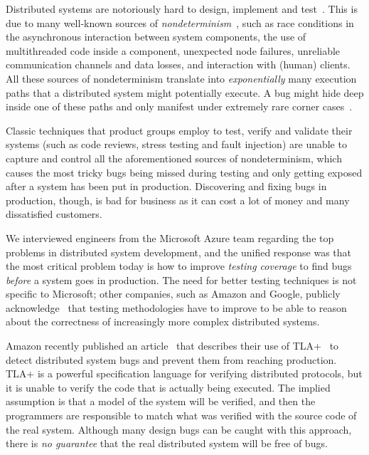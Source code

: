 Distributed systems are notoriously hard to design, implement and test~\cite{cavage2013there, maddox2015test}. This is due to many well-known sources of \emph{nondeterminism}~\cite{chandra2007paxos}, such as race conditions in the asynchronous interaction between system components, the use of multithreaded code inside a component, unexpected node failures, unreliable communication channels and data losses, and interaction with (human) clients.
%
All these sources of nondeterminism translate into \emph{exponentially} many execution paths that a distributed system might potentially execute. A bug might hide deep inside one of these paths and only manifest under extremely rare corner cases~\cite{gray1986computers, musuvathi2008finding}.

Classic techniques that product groups employ to test, verify and validate their systems (such as code reviews, stress testing and fault injection) are unable to capture and control all the aforementioned sources of nondeterminism, which causes the most tricky bugs being missed during testing and only getting exposed after a system has been put in production. Discovering and fixing bugs in production, though, is bad for business as it can cost a lot of money and many dissatisfied customers.

We interviewed engineers from the Microsoft Azure team regarding the top problems in distributed system development, and the unified response was that the most critical problem today is how to improve \emph{testing coverage} to find bugs \emph{before} a system goes in production. The need for better testing techniques is not specific to Microsoft; other companies, such as Amazon and Google, publicly acknowledge~\cite{newcombe2015aws} that testing methodologies have to improve to be able to reason about the correctness of increasingly more complex distributed systems.

Amazon recently published an article~\cite{newcombe2015aws} that describes their use of TLA+~\cite{lamport1994temporal} to detect distributed system bugs and prevent them from reaching production. TLA+ is a powerful specification language for verifying distributed protocols, but it is unable to verify the code that is actually being executed. The implied assumption is that a model of the system will be verified, and then the programmers are responsible to match what was verified with the source code of the real system. Although many design bugs can be caught with this approach, there is \emph{no guarantee} that the real distributed system will be free of bugs.

